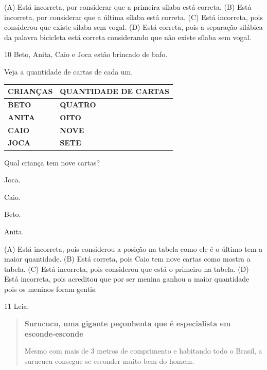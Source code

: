 (A) Está incorreta, por considerar que a primeira sílaba está correta.
(B) Está incorreta, por considerar que a última sílaba está correta.
(C) Está incorreta, pois considerou que existe sílaba sem vogal.
(D) Está correta, pois a separação silábica da palavra bicicleta está correta considerando que não existe sílaba sem vogal.

\num{10} Beto, Anita, Caio e Joca estão brincado de bafo.

Veja a quantidade de cartas de cada um.

\begin{longtable}[]{@{}ll@{}}
\toprule
\textbf{CRIANÇAS} & \textbf{QUANTIDADE DE CARTAS}\tabularnewline
\midrule
\endhead
\textbf{BETO} & \textbf{QUATRO}\tabularnewline
\textbf{ANITA} & \textbf{OITO}\tabularnewline
\textbf{CAIO} & \textbf{NOVE}\tabularnewline
\textbf{JOCA} & \textbf{SETE}\tabularnewline
\bottomrule
\end{longtable}

Qual criança tem nove cartas?

\begin{escolha}
\item Joca.

\item Caio.

\item Beto.

\item Anita.
\end{escolha}


(A) Está incorreta, pois considerou a posição na tabela como ele é o
último tem a maior quantidade.
(B) Está correta, pois Caio tem nove cartas como mostra a tabela.
(C) Está incorreta, pois considerou que está o primeiro na tabela.
(D) Está incorreta, pois acreditou que por ser menina ganhou a maior
quantidade pois os meninos foram gentis.

\num{11} Leia:

\begin{quote}
\textbf{Surucucu, uma gigante peçonhenta que é especialista em esconde-esconde}

Mesmo com mais de 3 metros de comprimento e habitando todo o Brasil, a
surucucu consegue se esconder muito bem do homem.
\end{quote}

